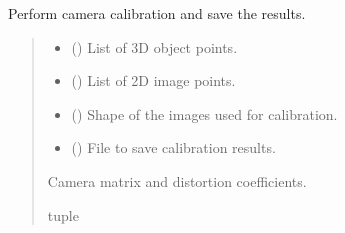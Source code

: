 \documentclass[letterpaper,10pt,english]{sphinxmanual}
\begin{document}
\begin{fulllineitems}
\label{\detokenize{PoseEstimator:PoseEstimator.camera_calibrator.calibrate_camera}}
\pysigstartsignatures
{}
\pysigstopsignatures
\sphinxAtStartPar
Perform camera calibration and save the results.
\begin{quote}\begin{description}
\begin{itemize}
\item {} 
\sphinxAtStartPar
{} () \textendash{} List of 3D object points.

\item {} 
\sphinxAtStartPar
{} () \textendash{} List of 2D image points.

\item {} 
\sphinxAtStartPar
{} () \textendash{} Shape of the images used for calibration.

\item {} 
\sphinxAtStartPar
{} () \textendash{} File to save calibration results.

\end{itemize}

\sphinxAtStartPar
Camera matrix and distortion coefficients.

\sphinxAtStartPar
tuple

\end{description}\end{quote}

\end{fulllineitems}

\end{document}
